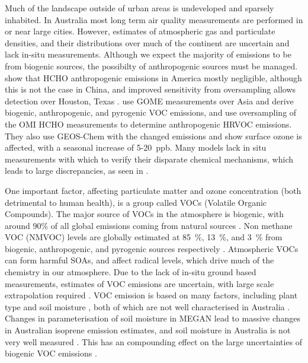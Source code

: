     Much of the landscape outside of urban areas is undeveloped and sparsely inhabited.
    In Australia most long term air quality measurements are performed in or near large cities.
    However, estimates of atmospheric gas and particulate densities, and their distributions over much of the continent are uncertain and lack in-situ measurements.
    Although we expect the majority of emissions to be from biogenic sources, the possibilty of anthropogenic sources must be managed.
    \cite{Millet2008} show that HCHO anthropogenic emissions in America mostly negligible, although this is not the case in China, and improved sensitivity from oversampling allows detection over Houston, Texas \citep{Fu2007, Zhu2014}.
    \cite{Fu2007} use GOME measurements over Asia and derive biogenic, anthropogenic, and pyrogenic VOC emissions, and \cite{Zhu2014} use oversampling of the OMI HCHO measurements to determine anthropogenic HRVOC emissions.
    They also use GEOS-Chem with the changed emissions and show surface ozone is affected, with a seasonal increase of 5-20~ppb.
    Many models lack in situ measurements with which to verify their disparate chemical mechanisms, which leads to large discrepancies, as seen in \cite{Marvin2017}.
    
    One important factor, affecting particulate matter and ozone concentration (both detrimental to human health), is a group called VOCs (Volatile Organic Compounds).
    The major source of VOCs in the atmosphere is biogenic, with around 90\% of all global emissions coming from natural sources \citep{Guenther1995,Guenther2006, Millet2006}.
    Non methane VOC (NMVOC) levels are globally estimated at 85~\%, 13~\%, and 3~\% from biogenic, anthropogenic, and pyrogenic sources respectively \citep{Kefauver2014}.  
    Atmospheric VOCs can form harmful SOAs, and affect radical levels, which drive much of the chemistry in our atmosphere.
    Due to the lack of in-situ ground based measurements, estimates of VOC emissions are uncertain, with large scale extrapolation required \citet{Millet2006}.
    VOC emission is based on many factors, including plant type and soil moisture \citep{Guenther1995}, both of which are not well characterised in Australia \citep{Sindelarova2014, Bauwens2016}.
    Changes in parameterisation of soil moisture in MEGAN lead to massive changes in Australian isoprene emission estimates, and soil moisture in Australia is not very well measured \citep{Sindelarova2014}.
    This has an compounding effect on the large uncertainties of biogenic VOC emissions \citep{Guenther2000, Millet2006}.
    
